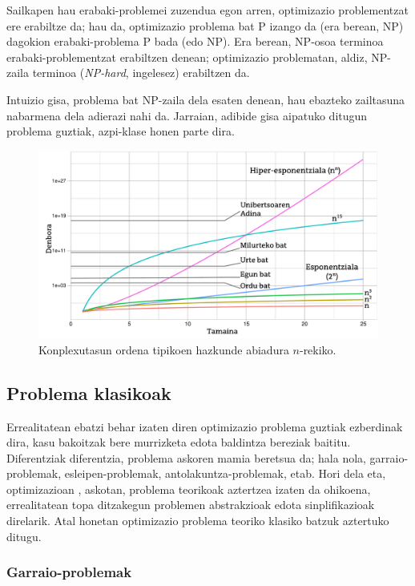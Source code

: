 \documentclass[eu]{ifirak}\usepackage[]{graphicx}\usepackage[]{color}
\begin{document}
Sailkapen hau erabaki-problemei zuzendua egon arren, optimizazio problementzat ere erabiltze da; hau da, optimizazio problema bat P izango da (era berean, NP) dagokion erabaki-problema P bada (edo NP). Era berean, NP-osoa terminoa erabaki-problementzat erabiltzen denean; optimizazio problematan, aldiz, NP-zaila terminoa (\textit{NP-hard}, ingelesez) erabiltzen da.

Intuizio gisa, problema bat NP-zaila dela esaten denean, hau ebazteko zailtasuna nabarmena dela adierazi nahi da. Jarraian, adibide gisa aipatuko ditugun problema guztiak, azpi-klase honen parte dira.

\begin{figure}[t]
\centering
\includegraphics[width=\linewidth]{./Irudiak/complexity_orders}
\caption{Konplexutasun ordena tipikoen hazkunde abiadura $n$-rekiko.}
\label{fig:complexity_orders}
\end{figure}

\subsection{Problema klasikoak}

Errealitatean ebatzi behar izaten diren optimizazio problema guztiak ezberdinak dira, kasu bakoitzak bere murrizketa edota baldintza bereziak baititu. Diferentziak diferentzia, problema askoren mamia beretsua da; hala nola, garraio-problemak, esleipen-problemak, antolakuntza-problemak, etab. Hori dela eta, optimizazioan , askotan, problema teorikoak aztertzea izaten da ohikoena, errealitatean topa ditzakegun problemen abstrakzioak edota sinplifikazioak direlarik. Atal honetan optimizazio problema teoriko klasiko batzuk aztertuko ditugu. %

\subsubsection{Garraio-problemak}\label{sec:tsp}
\end{document}
